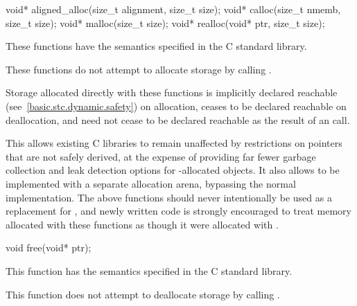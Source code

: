 %
%
%
%
\begin{itemdecl}
void* aligned_alloc(size_t alignment, size_t size);
void* calloc(size_t nmemb, size_t size);
void* malloc(size_t size);
void* realloc(void* ptr, size_t size);
\end{itemdecl}

\begin{itemdescr}
\pnum
\effects
These functions have the semantics specified in the C standard library.

\pnum
\remarks
These functions do not attempt to allocate
storage by calling .
%

\pnum
Storage allocated directly with these functions
is implicitly declared reachable
(see~\ref{basic.stc.dynamic.safety}) on allocation, ceases to be declared
reachable on deallocation, and need not cease to be declared reachable as the
result of an  call. \begin{note} This allows existing
C libraries to remain unaffected by restrictions on pointers that are not safely
derived, at the expense of providing far fewer garbage collection and leak
detection options for -allocated objects. It also allows
 to be implemented with a separate allocation arena, bypassing
the normal  implementation. The above functions
should never intentionally be used as a replacement for
, and newly written code is strongly encouraged to
treat memory allocated with these functions as though it were allocated with
. \end{note}
\end{itemdescr}

%
\begin{itemdecl}
void free(void* ptr);
\end{itemdecl}

\begin{itemdescr}
\pnum
\effects
This function has the semantics specified in the C standard library.

\pnum
\remarks
This function does not attempt to
deallocate storage by calling
.
\end{itemdescr}


